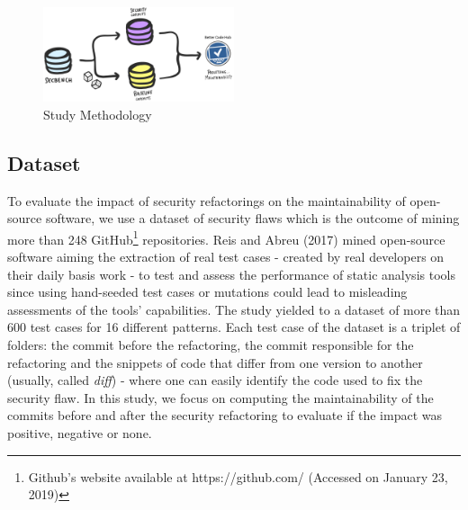 \documentclass[10pt,conference]{IEEEtran}
\begin{document}
\begin{figure}[h]
 	\centering
 	\includegraphics[width=0.5\textwidth]{figures/methodology.pdf}
 	\caption{Study Methodology}
	\label{fig:met}
\end{figure}

\subsection{Dataset}

To evaluate the impact of security refactorings on the maintainability of open-source software, we use a dataset of security flaws which is the outcome of mining more than 248 GitHub\footnote{Github's website available at https://github.com/ (Accessed on January 23, 2019)} repositories. Reis and Abreu (2017) mined open-source software aiming the extraction of real test cases - created by real developers on their daily basis work - to test and assess the performance of static analysis tools since using hand-seeded test cases or mutations could lead to misleading assessments of the tools' capabilities. The study yielded to a dataset of more than 600 test cases for 16 different patterns. Each test case of the dataset is a triplet of folders: the commit before the refactoring, the commit responsible for the refactoring and the snippets of code that differ from one version to another (usually, called \textit{diff}) - where one can easily identify the code used to fix the security flaw. In this study, we focus on computing the maintainability of the commits before and after the security refactoring to evaluate if the impact was positive, negative or none.
\end{document}
